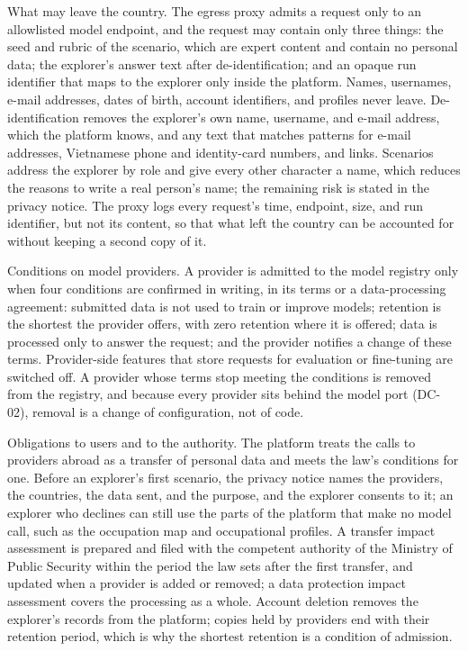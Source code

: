 What may leave the country. The egress proxy admits a request only to an allowlisted model endpoint, and the request may contain only three things: the seed and rubric of the scenario, which are expert content and contain no personal data; the explorer's answer text after de-\allowbreak{}identification; and an opaque run identifier that maps to the explorer only inside the platform. Names, usernames, e-mail addresses, dates of birth, account identifiers, and profiles never leave. De-\allowbreak{}identification removes the explorer's own name, username, and e-mail address, which the platform knows, and any text that matches patterns for e-mail addresses, Vietnamese phone and identity-\allowbreak{}card numbers, and links. Scenarios address the explorer by role and give every other character a name, which reduces the reasons to write a real person's name; the remaining risk is stated in the privacy notice. The proxy logs every request's time, endpoint, size, and run identifier, but not its content, so that what left the country can be accounted for without keeping a second copy of it.

Conditions on model providers. A provider is admitted to the model registry only when four conditions are confirmed in writing, in its terms or a data-\allowbreak{}processing agreement: submitted data is not used to train or improve models; retention is the shortest the provider offers, with zero retention where it is offered; data is processed only to answer the request; and the provider notifies a change of these terms. Provider-\allowbreak{}side features that store requests for evaluation or fine-tuning are switched off. A provider whose terms stop meeting the conditions is removed from the registry, and because every provider sits behind the model port (DC-02), removal is a change of configuration, not of code.

Obligations to users and to the authority. The platform treats the calls to providers abroad as a transfer of personal data and meets the law's conditions for one\cite{r99,r100}. Before an explorer's first scenario, the privacy notice names the providers, the countries, the data sent, and the purpose, and the explorer consents to it; an explorer who declines can still use the parts of the platform that make no model call, such as the occupation map and occupational profiles. A transfer impact assessment is prepared and filed with the competent authority of the Ministry of Public Security within the period the law sets after the first transfer, and updated when a provider is added or removed; a data protection impact assessment covers the processing as a whole. Account deletion removes the explorer's records from the platform; copies held by providers end with their retention period, which is why the shortest retention is a condition of admission.

